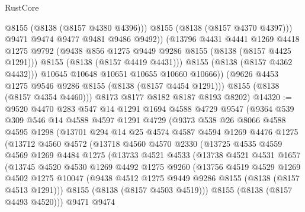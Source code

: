 \begin{lexlean}{RustCore}
\begin{coremodule}
                      @8155
                      (@8138 (@8157 @4380 @4396)))
                    @8155
                    (@8138 (@8157 @4370 @4397)))
                  @9471
                  @9474
                  @9477
                  @9481
                  @9486
                  @9492))
              (@13796
                @4431
                @4441
                @1269
                @4418
                @1275
                @9792
                (@9438 @856 @1275 @9449 @9286 @8155 (@8138 (@8157 @4425 @1291)))
                @8155
                (@8138 (@8157 @4419 @4431)))
              @8155
              (@8138 (@8157 @4362 @4432)))
            @10645
            @10648
            @10651
            @10655
            @10660
            @10666))
        (@9626 @4453 @1275 @9546 @9286 @8155 (@8138 (@8157 @4454 @1291)))
        @8155
        (@8138 (@8157 @4354 @4460)))
      @8173
      @8177
      @8182
      @8187
      @8193
      @8202)
@14320 := @9520
    @4470
    @283
    @547
    @14
    @1291
    @1694
    @4588
    @4729
    @9547
    (@9364
      @539
      @309
      @546
      @14
      @4588
      @4597
      @1291
      @4729
      (@9373
        @538
        @26
        @8066
        @4588
        @4595
        @1298
        (@13701
          @294
          @14
          @25
          @4574
          @4587
          @4594
          @1269
          @4476
          @1275
          (@13712
            @4560
            @4572
            (@13718
              @4560
              @4570
              @2330
              (@13725
                @4535
                @4559
                @4569
                @1269
                @4484
                @1275
                (@13733
                  @4521
                  @4533
                  (@13738
                    @4521
                    @4531
                    @1657
                    (@13745
                      @4520
                      @4530
                      @1269
                      @4492
                      @1275
                      @9260
                      (@13756
                        @4519
                        @4529
                        @1269
                        @4502
                        @1275
                        @10047
                        (@9438 @4512 @1275 @9449 @9286 @8155 (@8138 (@8157 @4513 @1291)))
                        @8155
                        (@8138 (@8157 @4503 @4519)))
                      @8155
                      (@8138 (@8157 @4493 @4520)))
                    @9471
                    @9474

\end{coremodule}
\end{lexlean}
